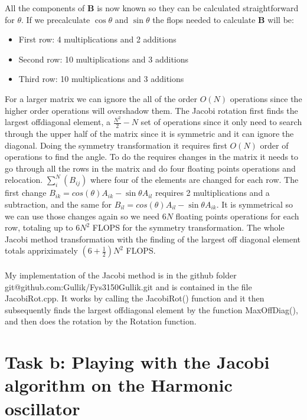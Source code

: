 \documentclass[11pt,a4wide]{article}
\begin{document}
		\noindent All the components of \(\mathbf{B}\) is now known so they can be calculated straightforward for \(\theta\).
		If we precalculate \(\cos{\theta}\) and \(\sin{\theta}\) the flops needed to calculate \(\mathbf{B}\) will be:
		
		\begin{itemize}
		\item First row: 4 multiplications and 2 additions
		\item Second row: 10 multiplications and 3 additions
		\item Third row: 10 multiplications and 3 additions
		\end{itemize}
		
		For a larger matrix we can ignore the all of the order \(O(N)\) operations since the higher order operations will overshadow them.
		The Jacobi rotation first finds the largest offdiagonal element, a \(\frac{N^2}{2} - N\) set of operations since it only need to 
		search through the upper half of the matrix since it is symmetric and it can ignore the diagonal. Doing the symmetry transformation
		it requires first \(O(N)\) order of operations to find the angle. To do the requires changes in the matrix it needs to go through 
		all the rows in the matrix and do four floating points operations and relocation. \(\sum_i^N(B_{ij})\) where four of the elements
		are changed for each row. The first change \(B_{ik} = cos(\theta)A_{ik} - \sin{\theta}A_{il}\) requires 2 multiplications and a subtraction,
		and the same for \(B_{il} = cos(\theta)A_{il} - \sin{\theta}A_{ik}\). It is symmetrical so we can use those changes again so we need
		\(6N\) floating points operations for each row, totaling up to \(6N^2\) FLOPS for the symmetry transformation. The whole Jacobi method 
		transformation with the finding of the largest off diagonal element totals appriximately \((6+\frac{1}{2})N^2\) FLOPS.
		\\ \\
		My implementation of the Jacobi method is in the github folder git@github.com:Gullik/Fys3150Gullik.git and is 
		contained in the file JacobiRot.cpp. It works by calling the JacobiRot() function and it then subsequently finds the 
		largest offdiagonal element by the function MaxOffDiag(), and then does the rotation by the Rotation function.

\section{Task b: Playing with the Jacobi algorithm on the Harmonic oscillator}
\end{document}
